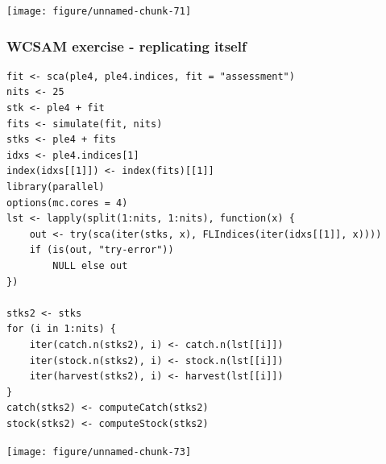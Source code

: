 \documentclass[a4paper,english,10pt]{article}\usepackage[]{graphicx}\usepackage[]{color}
\makeatletter
\newenvironment{kframe}{%
 \def\at@end@of@kframe{}%
 \ifinner\ifhmode%
  \def\at@end@of@kframe{\end{minipage}}%
  \begin{minipage}{\columnwidth}%
 \fi\fi%
 \def\FrameCommand##1{\hskip\@totalleftmargin \hskip-\fboxsep
 \colorbox{shadecolor}{##1}\hskip-\fboxsep
     \hskip-\linewidth \hskip-\@totalleftmargin \hskip\columnwidth}%
 \MakeFramed {\advance\hsize-\width
   \@totalleftmargin\z@ \linewidth\hsize
   \@setminipage}}%
 {\par\unskip\endMakeFramed%
 \at@end@of@kframe}
\newenvironment{knitrout}{}{} %
\makeatother
\begin{document}
\begin{knitrout}
\color{fgcolor}

{\centering \texttt{[image: figure/unnamed-chunk-71]} 

}



\end{knitrout}




\subsubsection{WCSAM exercise - replicating itself}

\begin{knitrout}
\color{fgcolor}\begin{kframe}
\begin{verbatim}
fit <- sca(ple4, ple4.indices, fit = "assessment")
nits <- 25
stk <- ple4 + fit
fits <- simulate(fit, nits)
stks <- ple4 + fits
idxs <- ple4.indices[1]
index(idxs[[1]]) <- index(fits)[[1]]
library(parallel)
options(mc.cores = 4)
lst <- lapply(split(1:nits, 1:nits), function(x) {
    out <- try(sca(iter(stks, x), FLIndices(iter(idxs[[1]], x))))
    if (is(out, "try-error")) 
        NULL else out
})

stks2 <- stks
for (i in 1:nits) {
    iter(catch.n(stks2), i) <- catch.n(lst[[i]])
    iter(stock.n(stks2), i) <- stock.n(lst[[i]])
    iter(harvest(stks2), i) <- harvest(lst[[i]])
}
catch(stks2) <- computeCatch(stks2)
stock(stks2) <- computeStock(stks2)
\end{verbatim}
\end{kframe}
\end{knitrout}


\begin{knitrout}
\color{fgcolor}

{\centering \texttt{[image: figure/unnamed-chunk-73]} 

}



\end{knitrout}
\end{document}
